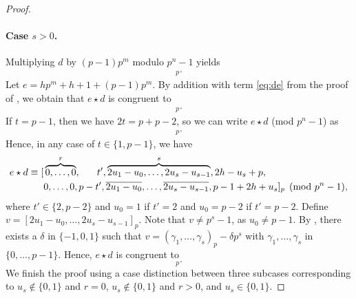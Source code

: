 \documentclass[12pt]{article}
\newcommand{\comp}[1]{\bar{#1}}
\begin{document}
\begin{proof}
\paragraph{Case $s>0$.} 
Multiplying $d$ by $(p-1)p^m$ modulo $p^n - 1$ yields
\begin{align*}
[&\overbrace{0,\dots,0}^r,t,u_1-t,\overbrace{u_2-u_1,u_3-u_2,\dots,u_s-u_{s-1}}^{s-1},p-1-u_s,\\
&\overbrace{0,\dots,0}^r,-t,-(u_1-t),\overbrace{-(u_2-u_1),-(u_3-u_2),\dots,-(u_s-u_{s-1})}^{s-1},p-1+u_s]_p.    
\end{align*}
Let $e = hp^m + h+1 + (p-1)p^m$. By addition with term \eqref{eq:de} from the proof of , we obtain that $e \star d$ is congruent to
\begin{align*}
    [&\overbrace{0,\dots,0}^r,\phantom{p-}\;\,2t,2u_1-t,\overbrace{2u_2-u_1,\ldots,2u_s-u_{s-1}}^{s-1}, 2h-u_s+p,\\ &\,0,\dots,0,p-2t, \overline{2u_1-t},\overline{2u_2-u_1},\dots,\overline{2u_s-u_{s-1}},p-1+2h+u_s]_p.
\end{align*}
If $t = p-1$, then we have $2t = p + p-2$, so we can write $e \star d$ (mod $p^n-1$) as
\begin{align*}
    [&\overbrace{0,\dots,0}^r,\hphantom{p-()}p-2,2u_1-(p-2),\overbrace{2u_2-u_1,\dots,2u_s-u_{s-1}}^{s-1}, 2h-u_s+p,\\ &\,0,\dots,0,\,p-(p-2), \overline{2u_1-(p-2)},\overline{2u_2-u_1},\dots,\overline{2u_s-u_{s-1}},p-1+2h+u_s]_p.
\end{align*}
Hence, in any case of $t \in \{1,p-1\}$, we have
\begin{align*}
e \star d \equiv [&\overbrace{0,\dots,0}^r,\hphantom{p-}\;\,t',\overbrace{2u_1-u_0,\ldots,2u_s-u_{s-1}}^{s}, 2h-u_s+p,\\ &0,\dots,0,p-t', \overline{2u_1-u_0},\ldots,\overline{2u_s-u_{s-1}},p-1+2h+u_s]_p \pmod {p^n-1},
\end{align*}
where $t' \in \{2,p-2\}$ and $u_0 = 1$ if $t' = 2$ and $u_0 = p - 2$ if $t' = p - 2$. Define $v = [2u_1-u_0,\dots,2u_s - u_{s-1}]_p$. Note that $v \neq p^s-1$, as $u_0 \neq p-1$.
By , there exists a $\delta$ in $\{-1, 0, 1\}$ such that $v = (\gamma_1, \ldots, \gamma_s)_p - \delta p^s$ with $\gamma_1, \ldots, \gamma_s$ in $\{0,\dots,p-1\}$. Hence, $e \star d$ is congruent to
\begin{equation*}
[\overbrace{0,\dots,0}^r,t',\overbrace{\gamma_1,\dots,\gamma_s}^s, 2h-u_s+p-\delta, \overbrace{0,\dots,0}^r,p-t', \overbrace{\comp{\gamma}_1,\dots,\comp{\gamma}_s}^s,p-1+2h+u_s+\delta]_p.
\end{equation*}
We finish the proof using a case distinction between three subcases corresponding to $u_s \notin \{0, 1\}$ and $r = 0$, $u_s \notin \{0, 1\}$ and $r > 0$, and $u_s \in \{0, 1\}$.


\end{proof}
\end{document}
